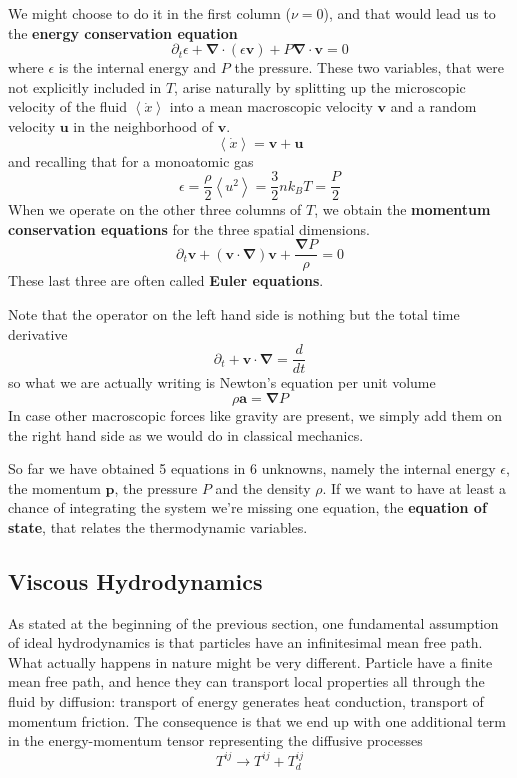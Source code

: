 We might choose to do it in the first column ($\nu=0$), and that would lead us to the \textbf{energy conservation equation}
\begin{equation} \label{consen}
	\partial_t \epsilon + \mathbf{ \nabla} \cdot (\epsilon \mathbf{v}) + P\mathbf{ \nabla} \cdot \mathbf{v}=0
\end{equation}
where $\epsilon$ is the internal energy and $P$ the pressure. These two variables, that were not explicitly included in $T$, arise naturally by splitting up the microscopic velocity of the fluid $\left <  \dot{x} \right >$ into a mean macroscopic velocity $\mathbf{v}$ and a random velocity $\mathbf{u}$ in the neighborhood of $\mathbf{v}$. 
$$\left <  \dot{x} \right >= \mathbf{v}  +  \mathbf{u} $$
and recalling that for a monoatomic gas
$$\epsilon = \frac{\rho}{2} \left <  u^2 \right > = \frac{3}{2} n k_B T= \frac{P}{2}$$
When we operate on the other three columns of $T$, we obtain the \textbf{momentum conservation equations} for the three spatial dimensions.
\begin{equation} \label{euler}
	\partial_t \mathbf{v} + (\mathbf{v} \cdot \mathbf{\nabla}) \mathbf{v} + \frac{\mathbf{ \nabla} P}{\rho}=0
\end{equation}
These last three are often called \textbf{Euler equations}. 

Note that the operator on the left hand side is nothing but the total time derivative
$$
\partial_t + \mathbf{v} \cdot \mathbf{ \nabla} = \frac{d}{dt}
$$
so what we are actually writing is Newton's equation per unit volume
$$
\rho \mathbf{a} = \mathbf{\nabla} P
$$
In case other macroscopic forces like gravity are present, we simply add them on the right hand side as we would do in classical mechanics. 

So far we have obtained 5 equations in 6 unknowns, namely the internal energy $\epsilon$, the momentum $\mathbf{p}$, the pressure $P$ and the density $\rho$. If we want to have at least a chance of integrating the system we're missing one equation, the \textbf{equation of state}, that relates the thermodynamic variables.

\subsection{Viscous Hydrodynamics}

As stated at the beginning of the previous section, one fundamental assumption of ideal hydrodynamics is that particles have an infinitesimal mean free path. What actually happens in nature might be very different. Particle have a finite mean free path, and hence they can transport local properties all through the fluid by diffusion: transport of energy generates heat conduction, transport of momentum friction. The consequence is that we end up with one additional term in the energy-momentum tensor representing the diffusive processes
$$
T^{ij} \to T^{ij} + T^{ij}_d 
$$

